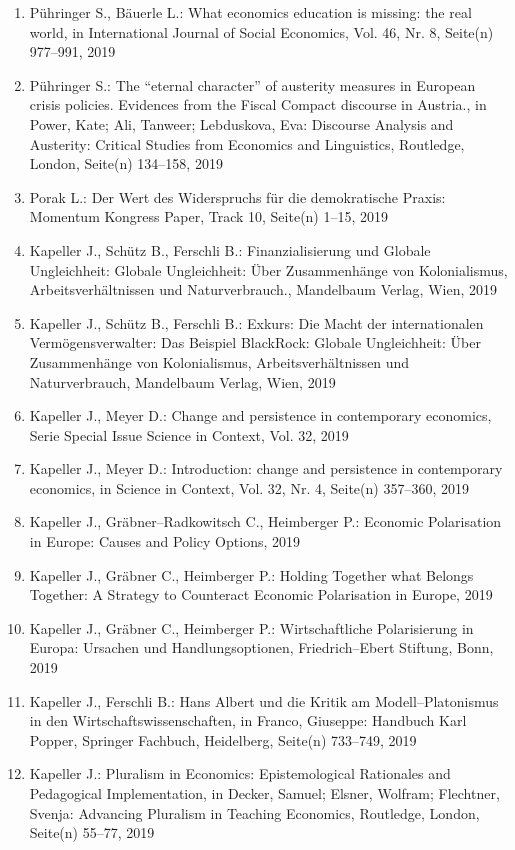 \begin{enumerate}
	 \item Pühringer S., Bäuerle L.: What economics education is missing: the real world, in International Journal of Social Economics, Vol. 46, Nr. 8, Seite(n) 977--991, 2019
	 \item Pühringer S.: The “eternal character” of austerity measures in European crisis policies. Evidences from the Fiscal Compact discourse in Austria., in Power, Kate; Ali, Tanweer; Lebduskova, Eva: Discourse Analysis and Austerity: Critical Studies from Economics and Linguistics, Routledge, London, Seite(n) 134--158, 2019
	 \item Porak L.: Der Wert des Widerspruchs für die demokratische Praxis: Momentum Kongress Paper, Track 10, Seite(n) 1--15, 2019
	 \item Kapeller J., Schütz B., Ferschli B.: Finanzialisierung und Globale Ungleichheit: Globale Ungleichheit: Über Zusammenhänge von Kolonialismus, Arbeitsverhältnissen und Naturverbrauch., Mandelbaum Verlag, Wien, 2019
	 \item Kapeller J., Schütz B., Ferschli B.: Exkurs: Die Macht der internationalen Vermögensverwalter: Das Beispiel BlackRock: Globale Ungleichheit: Über Zusammenhänge von Kolonialismus, Arbeitsverhältnissen und Naturverbrauch, Mandelbaum Verlag, Wien, 2019
	 \item Kapeller J., Meyer D.: Change and persistence in contemporary economics, Serie Special Issue Science in Context, Vol. 32, 2019
	 \item Kapeller J., Meyer D.: Introduction: change and persistence in contemporary economics, in Science in Context, Vol. 32, Nr. 4, Seite(n) 357--360, 2019
	 \item Kapeller J., Gräbner--Radkowitsch C., Heimberger P.: Economic Polarisation in Europe: Causes and Policy Options, 2019
	 \item Kapeller J., Gräbner C., Heimberger P.: Holding Together what Belongs Together: A Strategy to Counteract Economic Polarisation in Europe, 2019
	 \item Kapeller J., Gräbner C., Heimberger P.: Wirtschaftliche Polarisierung in Europa: Ursachen und Handlungsoptionen, Friedrich--Ebert Stiftung, Bonn, 2019
	 \item Kapeller J., Ferschli B.: Hans Albert und die Kritik am Modell--Platonismus in den Wirtschaftswissenschaften, in Franco, Giuseppe: Handbuch Karl Popper, Springer Fachbuch, Heidelberg, Seite(n) 733--749, 2019
	 \item Kapeller J.: Pluralism in Economics: Epistemological Rationales and Pedagogical Implementation, in Decker, Samuel; Elsner, Wolfram; Flechtner, Svenja: Advancing Pluralism in Teaching Economics, Routledge, London, Seite(n) 55--77, 2019

\end{enumerate}
